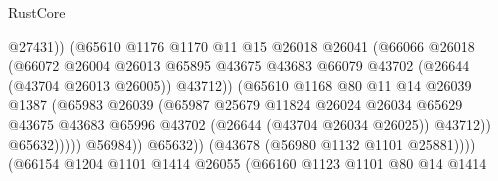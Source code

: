 \begin{lexlean}{RustCore}
\begin{coremodule}
                                          @27431))
                                      (@65610
                                        @1176
                                        @1170
                                        @11
                                        @15
                                        @26018
                                        @26041
                                        (@66066
                                          @26018
                                          (@66072
                                            @26004
                                            @26013
                                            @65895
                                            @43675
                                            @43683
                                            @66079
                                            @43702
                                            (@26644 (@43704 @26013 @26005))
                                            @43712))
                                        (@65610
                                          @1168
                                          @80
                                          @11
                                          @14
                                          @26039
                                          @1387
                                          (@65983
                                            @26039
                                            (@65987
                                              @25679
                                              @11824
                                              @26024
                                              @26034
                                              @65629
                                              @43675
                                              @43683
                                              @65996
                                              @43702
                                              (@26644 (@43704 @26034 @26025))
                                              @43712))
                                          @65632)))))
                                @56984))
                            @65632))
                        (@43678 (@56980 @1132 @1101 @25881))))
                    (@66154
                      @1204
                      @1101
                      @1414
                      @26055
                      (@66160
                        @1123
                        @1101
                        @80
                        @14
                        @1414

\end{coremodule}
\end{lexlean}
